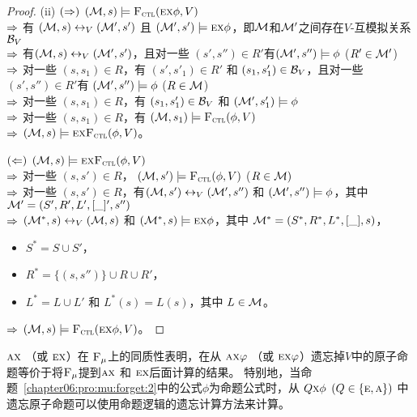 \begin{proof}
	(ii) $(\Rightarrow)$ $({\cal M},s)\models{\textsc{F}_{\textsc{ctl}}}(\textsc{e}\textsc{x}\phi,V)$\\
	$\Rightarrow$ 有 $({\cal M},s)\leftrightarrow_V({\cal M}',s')$ 且 $({\cal M}',s')\models \textsc{e}\textsc{x}\phi$，即${\cal M}$和${\cal M}'$之间存在$V$-互模拟关系${\cal B}_V$\\
	$\Rightarrow$ 有$({\cal M},s)\leftrightarrow_V({\cal M}',s')$，且对一些 $(s',s'')\in R'$有$({\cal M}',s'')\models \phi$  ($R'\in{\cal M}'$)\\
	$\Rightarrow$ 对一些 $(s,s_1)\in R$，有 $(s',s'_1)\in R'$ 和 $(s_1, s_1') \in {\cal B}_V$，且对一些$(s',s'')\in R'$有
	$({\cal M}',s'')\models \phi$ ($R\in {\cal M}$)\\
	$\Rightarrow$ 对一些 $(s,s_1)\in R$，有 $(s_1, s_1') \in {\cal B}_V$ 和 $({\cal M}',s'_1)\models\phi$\\
	$\Rightarrow$ 对一些 $(s,s_1)\in R$，有 $({\cal M},s_1)\models{\textsc{F}_{\textsc{ctl}}}(\phi,V)$\\
	$\Rightarrow$ $({\cal M},s)\models\textsc{e}\textsc{x}{\textsc{F}_{\textsc{ctl}}}(\phi,V)$。
	
	$(\Leftarrow)$ $({\cal M},s)\models\textsc{e} \textsc{x}{\textsc{F}_{\textsc{ctl}}}(\phi,V)$\\
	$\Rightarrow$ 对一些 $(s,s')\in R$， $({\cal M},s')\models{\textsc{F}_{\textsc{ctl}}}(\phi,V)$ ($R\in {\cal M})$\\
	$\Rightarrow$ 对一些 $(s,s')\in R$，有$({\cal M},s')\leftrightarrow_V({\cal M}',s'')$ 和 $({\cal M}',s'')\models\phi$，其中 ${\cal M}'=(S',R',L',[\_]',s'')$ \\
	$\Rightarrow$ $({\cal M}^*,s)\leftrightarrow_V({\cal M},s)$ 和 $({\cal M}^*,s)\models\textsc{e}\textsc{x}\phi$，其中
	${\cal M}^*=(S^*,R^*,L^*,[\_], s)$，
	\begin{itemize}
		\item $S^*=S\cup S'$，
		\item $R^*=\{(s,s'')\}\cup R \cup R'$，
		\item $L^*= L \cup L'$ 和 $L^*(s)=L(s)$，其中 $L\in{\cal M}$。
	\end{itemize}
	$\Rightarrow$ $({\cal M},s)\models {\textsc{F}_{\textsc{ctl}}}(\textsc{e}\textsc{x}\phi,V)$。
	
\end{proof}


 $\textsc{a}\textsc{x}$ （或 $\textsc{e}\textsc{x}$）在 ${\textsc{F}_{\textsc{$\mu$}}}$上的同质性表明，在从 $\textsc{a}\textsc{x} \varphi$ （或 $\textsc{e}\textsc{x} \varphi$）遗忘掉$V$中的原子命题等价于将${\textsc{F}_{\textsc{$\mu$}}}$提到$\textsc{a}\textsc{x}$ 和 $\textsc{e} \textsc{x}$后面计算的结果。
特别地，当命题~\ref{chapter06:pro:mu:forget:2}中的公式$\phi$为命题公式时，从
$Q\textsc{x} \phi$ $(Q\in \{\textsc{e}, \textsc{a}\})$ 中遗忘原子命题可以使用命题逻辑的遗忘计算方法来计算。

